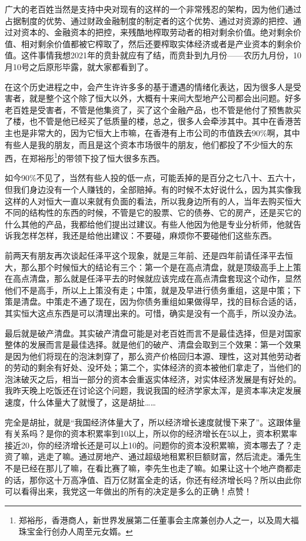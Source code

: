 \documentclass[UTF8, 12pt, a4paper]{ctexrep}
\begin{document}
广大的老百姓当然是支持中央对现有的这样的一个非常残忍的架构，因为他们通过占据制度的优势、通过财政金融制度的制定者的这个优势、通过对资源的把控、通过对资本的、金融资本的把控，来残酷地榨取劳动者的相对剩余价值。绝对剩余价值、相对剩余价值都被它榨取了，然后还要榨取实体经济或者是产业资本的剩余价值。这件事情我想2021年的贲卦就应有了结，而贲卦到九月份——农历九月份，10月10号之后原形毕露，就大家都看到了。

在这个历史进程之中，会产生许许多多的基于遭遇的情绪化表达，因为很多人是受害者，就是整个这个除了恒大以外，大概有十来间大型地产公司都会出问题。好多老百姓是受害者，不管是他集资了，买了这个金融产品，也不管是他付了预售款买了楼，也不管是他已经买了低质量的楼，总之，很多人会牵涉其中。其中在香港苦主也是非常大的，因为它恒大上市嘛，在香港有上市公司的市值跌去90\%啊，其中有些人是我的朋友，而且是这个资本市场很牛的朋友，他们都投了不少恒大的东西，在郑裕彤\footnote{郑裕彤，香港商人，新世界发展第二任董事会主席兼创办人之一，以及周大福珠宝金行创办人周至元女婿。}的带领下投了恒大很多东西。

如今90\%不见了，当然有些人投的低一点，可能丢掉的是百分之七八十、五六十，但我们身边没有一个人赚钱的，全部赔掉。有的时候不太好说什么，因为其实像我这样的人对恒大一直以来就有负面的看法，所以我身边所有的人，当年去购买恒大不同的结构性的东西的时候，不管是它的股票、它的债券、它的房产，还是买它的什么其他的产品，我都给他们提出过建议。有些人他因为他是专业分析师，他就告诉我怎样怎样，我还是给他出建议：不要碰，麻烦你不要碰他们这些东西。

前两天有朋友再次谈起任泽平这个现象，就是三年前、还是四年前请任泽平去恒大，那么那个时候恒大的结论有三个：第一个是在高点清盘，就是顶级高手上上策在高点清盘，那么就是任泽平去的时候就应该完成在高点清盘套现这个动作，显然他们不是高手，所以上上策没有走；中策，就是及早进行债务重组，这是中策；下策是清盘。中策走不通了现在，因为你债务重组如果做得早，找的目标合适的话，其实恒大这点东西是可以清理出来的。可惜，确实是没有一个高手，所以没办法。

最后就是破产清盘。其实破产清盘可能是对老百姓而言不是最佳选择，但是对国家整体的发展而言是最佳选择。就是他们的破产、清盘会取到三个效果：第一个效果是因为他们将现在的泡沫刺穿了，那么资产价格回归本源、理性，这对其他劳动者的劳动的剩余有好处、没坏处；第二个，实体经济的资本被他们拿走了，当他们的泡沫破灭之后，相当一部分的资本会重返实体经济，对实体经济发展是有好处的。我昨天晚上吃饭还在讨论这个问题，我说我国的经济学家太浑，是资本率决定发展速度，什么体量大了就慢了，这是胡扯……

完全是胡扯，就是“我国经济体量大了，所以经济增长速度就慢下来了”。这跟体量有关系吗？是你的资本积累率到10以上，所以你的经济增长在5以上，资本积累率接近20，你的经济增长还是可以上10的。问题你的资本没积累嘛，资本哪去了？走资了嘛，逃走了嘛。通过房地产、通过超级地租累积巨额财富，然后流走。潘先生不是已经在那儿了嘛，在看比赛了嘛，李先生也走了嘛。如果让这十个地产商都走的话，那你这十万高净值、百万亿财富全走的话，你还有经济增长吗？所以由此你可以看得出来，我党这一年做出的所有的决定是多么的正确！点赞！
\end{document}
